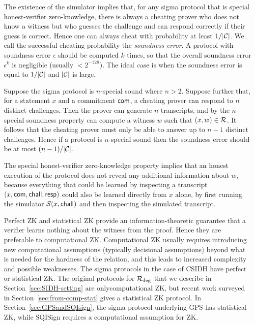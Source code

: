 \begin{remark}
The existence of the simulator implies that, for any sigma protocol that is special honest-verifier zero-knowledge, there is always a cheating prover who does not know a witness but who guesses the challenge and can respond correctly if their guess is correct.
Hence one can always cheat with probability at least $1/|\CC|$.
We call the successful cheating probability the \emph{soundness error}.
A protocol with soundness error $\epsilon$ should be computed $k$ times, so that the overall soundness error $\epsilon^k$ is negligible (usually $< 2^{-128}$). 
The ideal case is when the soundness error is equal to $1/|\CC|$ and $|\CC|$ is large.

 Suppose the sigma protocol is $n$-special sound where $n > 2$. Suppose further that, for a statement $x$ and a commitment $\com$, a cheating prover can respond to $n$ distinct challenges. Then the prover can generate $n$ transcripts, and by the $n$-special soundness property can compute a witness $w$ such that $(x,w) \in \Rela$. It follows that the cheating prover must only be able to answer up to $n-1$ distinct challenges. Hence if a protocol is $n$-special sound then the soundness error should be at most $(n-1)/|\CC|$.
\end{remark}

\begin{remark}
The special honest-verifier zero-knowledge property implies that an honest execution of the protocol does not reveal any additional information about $w$, because everything that could be learned by inspecting a transcript $(x,\com,\chall,\resp)$ could also be learned directly from $x$ alone, by first running the simulator $\Sim(x,\chall)$ and then inspecting the simulated transcript. 
\end{remark}

\begin{remark}
Perfect ZK and statistical ZK provide an information-theoretic guarantee that a verifier learns nothing about the witness from the proof. Hence they are preferable to computational ZK.
Computational ZK usually requires introducing new computational assumptions (typically decisional assumptions) beyond what is needed for the hardness of the relation, and this leads to increased complexity and possible weaknesses.
The sigma protocols in the case of CSIDH have perfect or statistical ZK.
The original protocols for $\R[deg]$ that we describe in Section~\ref{sec:SIDH-setting} are onlycomputational ZK, but recent work surveyed in Section~\ref{sec:from-comp-stat} gives a statistical ZK protocol.
In Section~\ref{sec:GPSandSQIsign}, the sigma protocol underlying GPS has statistical ZK, while SQISign requires a computational assumption for ZK.
\end{remark}




